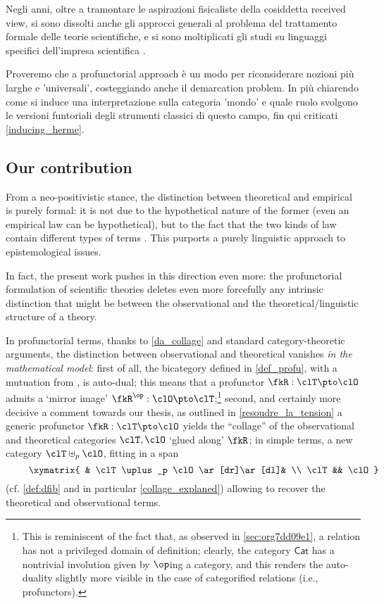 Negli anni, oltre a tramontare le aspirazioni fisicaliste della cosiddetta received view, si sono dissolti anche gli approcci generali al problema del trattamento formale delle teorie scientifiche, e si sono moltiplicati gli studi su linguaggi specifici dell'impresa scientifica \cite{}. 

Proveremo che a profunctorial approach è un modo per riconsiderare nozioni più larghe e 'universali', costeggiando anche il demarcation problem. In più chiarendo come si induce una interpretazione sulla categoria 'mondo' e quale ruolo svolgono le versioni funtoriali degli strumenti classici di questo campo, fin qui criticati \autoref{inducing_herme}. 

\subsection{Our contribution}
From a neo-positivistic stance, the distinction between theoretical and empirical is purely formal: it is not due to the hypothetical nature of the former (even an empirical law can be hypothetical), but to the fact that the two kinds of law contain different types of terms \cite{carnap56}. This purports a purely linguistic approach to epistemological issues. 

In fact, the present work pushes in this direction even more: the profunctorial formulation of scientific theories deletes even more forcefully any intrinsic distinction that might be between the observational and the theoretical\fshyp{}linguistic structure of a theory.

In profunctorial terms, thanks to \autoref{da_collage} and standard category\hyp{}theoretic arguments, the distinction between observational and theoretical vanishes \emph{in the mathematical model}: first of all, the bicategory defined in \autoref{def_profu}, with a mutuation from \cite{benabou2000distributors}, is auto-dual; this means that a profunctor $\fkR : \clT \pto \clO$ admits a `mirror image' $\fkR^\op : \clO \pto \clT$;\footnote{This is reminiscent of the fact that, as observed in \autoref{sec:org7dd09e1}, a relation has not a privileged domain of definition; clearly, the category $\mathsf{Cat}$ has a nontrivial involution given by $\op$ing a category, and this renders the auto-duality slightly more visible in the case of categorified relations (i.e., profunctors).} second, and certainly more decisive a comment towards our thesis, as outlined in \autoref{resoudre_la_tension} a generic profunctor $\fkR : \clT \pto\clO$ yields the ``collage'' of the observational and theoretical categories $\clT,\clO$ `glued along' $\fkR$; in simple terms, a new category $\clT\uplus_p\clO$, fitting in a span 
\[ \vcenter{\xymatrix{
	& \clT\uplus_p \clO \ar[dr]\ar[dl]& \\ 
	\clT  && \clO 
}} \] (cf. \autoref{def:dfib} and in particular \autoref{collage_explaned}) allowing to recover the theoretical and observational terms.

